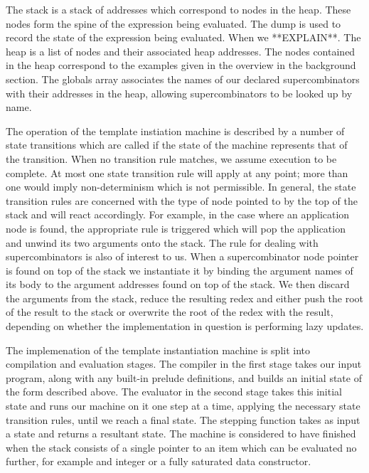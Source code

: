 \documentclass[11pt]{article}
\begin{document}
\noindent The stack is a stack of addresses which correspond
to nodes in the heap. These nodes form the spine of the 
expression being evaluated. The dump is used to record the
state of the expression being evaluated. When we **EXPLAIN**.
The heap is a list of nodes and their associated heap addresses.
The nodes contained in the heap correspond to the examples
given in the overview in the background section.
The globals array associates the names of our declared
supercombinators with their addresses in the heap, allowing
supercombinators to be looked up by name. 

The operation of the template instiation machine is described
by a number of state transitions which are called if the state
of the machine represents that of the transition. When no
transition rule matches, we assume execution to be complete. 
At most one state transition rule will apply at any point;
more than one would imply non-determinism which is not
permissible. In general, the state transition rules are
concerned with the type of node pointed to by the top of the
stack and will react accordingly. For example, in the case
where an application node is found, the appropriate rule
is triggered which will pop the application and unwind its
two arguments onto the stack. The rule for dealing with 
supercombinators is also of interest to us. When a 
supercombinator node pointer is found on top of the stack
we instantiate it by binding the argument names of its
body to the argument addresses found on top of the stack.
We then discard the arguments from the stack, reduce the
resulting redex and either push the root of the result 
to the stack or overwrite the root of the redex with the
result, depending on whether the implementation in question
is performing lazy updates. 

The implemenation of the template instantiation machine is
split into compilation and evaluation stages. The compiler
in the first stage takes our input program, along with
any built-in prelude definitions, and builds an initial
state of the form described above. The evaluator in the 
second stage takes this initial state and runs our machine
on it one step at a time, applying the necessary state
transition rules, until we reach a final state. The stepping
function takes as input a state and returns a resultant
state. The machine is considered to have finished when 
the stack consists of a single pointer to an item which
can be evaluated no further, for example and integer or
a fully saturated data constructor. 
\end{document}
